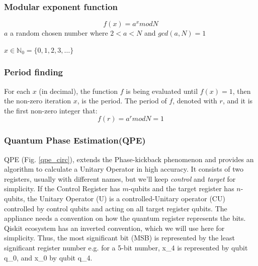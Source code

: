 \begin{flushleft}
\subsubsection{Modular exponent function}
\[
f(x) = a^x mod N
\]
$a$ a random chosen number where $2<a<N$ and $gcd(a,N)=1$

$x \in \mathbb{N}_0 = \{0, 1, 2, 3, \dots\}$

\subsubsection{Period finding}

For each $x$ (in decimal), the function $f$ is being evaluated until $f(x)=1$, then the non-zero iteration $x$, is the period. The period of $f$, denoted with $r$, and it is the first non-zero integer that:
\[
f(r) = a^r mod N = 1 \tag{1}
\]

\subsubsection{Quantum Phase Estimation(QPE)}

QPE (Fig. \ref{qpe_circ}), extends the Phase-kickback phenomenon and provides an algorithm to calculate a Unitary Operator in high accuracy. It consists of two registers, usually with different names, but we'll keep \textit{control} and \textit{target} for simplicity. If the Control Register has $m$-qubits and the target register has $n$-qubits, the Unitary Operator (U) is a controlled-Unitary operator (CU) controlled by control qubits and acting on all target register qubits. The appliance needs a convention on how the quantum register represents the bits. Qiskit ecosystem has an inverted convention, which we will use here for simplicity. Thus, the most significant bit (MSB) is represented by the least significant register number e.g. for a 5-bit number, x\_4 is represented by qubit q\_0, and x\_0 by qubit q\_4.


\end{flushleft}
